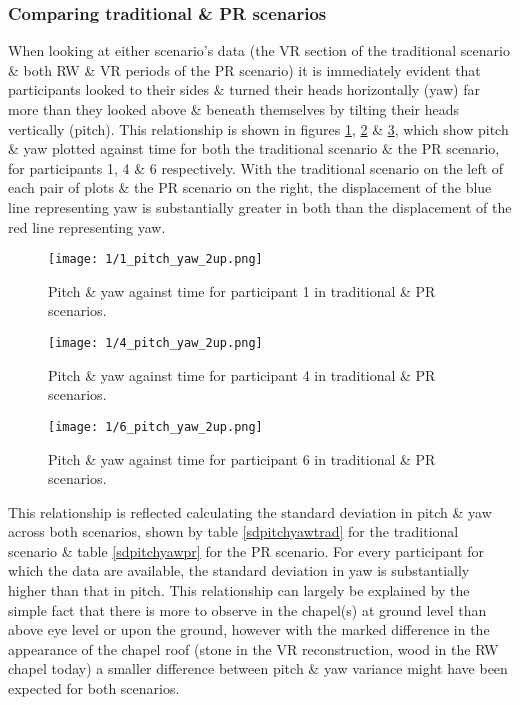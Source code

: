 \subsubsection{Comparing traditional \& PR scenarios}

When looking at either scenario's data (the VR section of the traditional scenario \& both RW \& VR periods of the PR scenario) it is immediately evident that participants looked to their sides \& turned their heads horizontally (yaw) far more than they looked above \& beneath themselves by tilting their heads vertically (pitch). This relationship is shown in figures \ref{1_pitch_yaw_2up.png}, \ref{4_pitch_yaw_2up.png} \& \ref{6_pitch_yaw_2up.png}, which show pitch \& yaw plotted against time for both the traditional scenario \& the PR scenario, for participants 1, 4 \& 6 respectively. With the traditional scenario on the left of each pair of plots \& the PR scenario on the right, the displacement of the blue line representing yaw is substantially greater in both than the displacement of the red line representing yaw.

\begin{figure}
	\begin{center}
	\texttt{[image: 1/1\_pitch\_yaw\_2up.png]}
	\caption{Pitch \& yaw against time for participant 1 in traditional \& PR scenarios.}
	\label{1_pitch_yaw_2up.png}
	\end{center}
\end{figure}

\begin{figure}
	\begin{center}
	\texttt{[image: 1/4\_pitch\_yaw\_2up.png]}
	\caption{Pitch \& yaw against time for participant 4 in traditional \& PR scenarios.}
	\label{4_pitch_yaw_2up.png}
	\end{center}
\end{figure}

\begin{figure}
	\begin{center}
	\texttt{[image: 1/6\_pitch\_yaw\_2up.png]}
	\caption{Pitch \& yaw against time for participant 6 in traditional \& PR scenarios.}
	\label{6_pitch_yaw_2up.png}
	\end{center}
\end{figure}

This relationship is reflected calculating the standard deviation in pitch \& yaw across both scenarios, shown by table \ref{sdpitchyawtrad} for the traditional scenario \& table \ref{sdpitchyawpr} for the PR scenario. For every participant for which the data are available, the standard deviation in yaw is substantially higher than that in pitch. This relationship can largely be explained by the simple fact that there is more to observe in the chapel(s) at ground level than above eye level or upon the ground, however with the marked difference in the appearance of the chapel roof (stone in the VR reconstruction, wood in the RW chapel today) a smaller difference between pitch \& yaw variance might have been expected for both scenarios.

